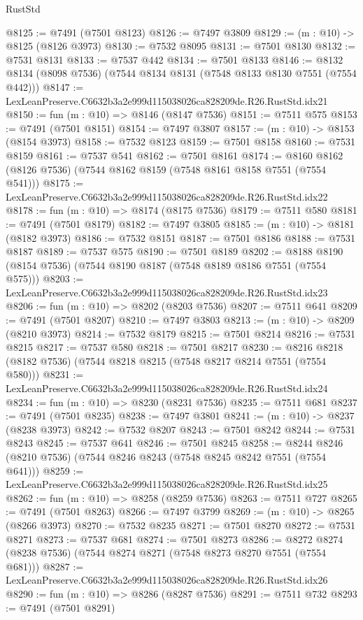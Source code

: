 \begin{lexlean}{RustStd}
\begin{coremodule}
@8125 := @7491 (@7501 @8123)
@8126 := @7497 @3809
@8129 := (m : @10) -> @8125 (@8126 @3973)
@8130 := @7532 @8095
@8131 := @7501 @8130
@8132 := @7531 @8131
@8133 := @7537 @442
@8134 := @7501 @8133
@8146 := @8132 @8134 (@8098 @7536) (@7544 @8134 @8131 (@7548 @8133 @8130 @7551 (@7554 @442)))
@8147 := LexLeanPreserve.C6632b3a2e999d115038026ca828209de.R26.RustStd.idx21
@8150 := fun (m : @10) => @8146 (@8147 @7536)
@8151 := @7511 @575
@8153 := @7491 (@7501 @8151)
@8154 := @7497 @3807
@8157 := (m : @10) -> @8153 (@8154 @3973)
@8158 := @7532 @8123
@8159 := @7501 @8158
@8160 := @7531 @8159
@8161 := @7537 @541
@8162 := @7501 @8161
@8174 := @8160 @8162 (@8126 @7536) (@7544 @8162 @8159 (@7548 @8161 @8158 @7551 (@7554 @541)))
@8175 := LexLeanPreserve.C6632b3a2e999d115038026ca828209de.R26.RustStd.idx22
@8178 := fun (m : @10) => @8174 (@8175 @7536)
@8179 := @7511 @580
@8181 := @7491 (@7501 @8179)
@8182 := @7497 @3805
@8185 := (m : @10) -> @8181 (@8182 @3973)
@8186 := @7532 @8151
@8187 := @7501 @8186
@8188 := @7531 @8187
@8189 := @7537 @575
@8190 := @7501 @8189
@8202 := @8188 @8190 (@8154 @7536) (@7544 @8190 @8187 (@7548 @8189 @8186 @7551 (@7554 @575)))
@8203 := LexLeanPreserve.C6632b3a2e999d115038026ca828209de.R26.RustStd.idx23
@8206 := fun (m : @10) => @8202 (@8203 @7536)
@8207 := @7511 @641
@8209 := @7491 (@7501 @8207)
@8210 := @7497 @3803
@8213 := (m : @10) -> @8209 (@8210 @3973)
@8214 := @7532 @8179
@8215 := @7501 @8214
@8216 := @7531 @8215
@8217 := @7537 @580
@8218 := @7501 @8217
@8230 := @8216 @8218 (@8182 @7536) (@7544 @8218 @8215 (@7548 @8217 @8214 @7551 (@7554 @580)))
@8231 := LexLeanPreserve.C6632b3a2e999d115038026ca828209de.R26.RustStd.idx24
@8234 := fun (m : @10) => @8230 (@8231 @7536)
@8235 := @7511 @681
@8237 := @7491 (@7501 @8235)
@8238 := @7497 @3801
@8241 := (m : @10) -> @8237 (@8238 @3973)
@8242 := @7532 @8207
@8243 := @7501 @8242
@8244 := @7531 @8243
@8245 := @7537 @641
@8246 := @7501 @8245
@8258 := @8244 @8246 (@8210 @7536) (@7544 @8246 @8243 (@7548 @8245 @8242 @7551 (@7554 @641)))
@8259 := LexLeanPreserve.C6632b3a2e999d115038026ca828209de.R26.RustStd.idx25
@8262 := fun (m : @10) => @8258 (@8259 @7536)
@8263 := @7511 @727
@8265 := @7491 (@7501 @8263)
@8266 := @7497 @3799
@8269 := (m : @10) -> @8265 (@8266 @3973)
@8270 := @7532 @8235
@8271 := @7501 @8270
@8272 := @7531 @8271
@8273 := @7537 @681
@8274 := @7501 @8273
@8286 := @8272 @8274 (@8238 @7536) (@7544 @8274 @8271 (@7548 @8273 @8270 @7551 (@7554 @681)))
@8287 := LexLeanPreserve.C6632b3a2e999d115038026ca828209de.R26.RustStd.idx26
@8290 := fun (m : @10) => @8286 (@8287 @7536)
@8291 := @7511 @732
@8293 := @7491 (@7501 @8291)

\end{coremodule}
\end{lexlean}
